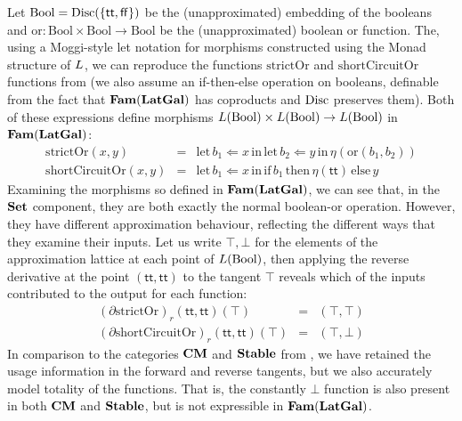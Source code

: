 \newcommand{\Bool}{\mathrm{Bool}}

Let $\Bool = \Disc(\{\mathsf{tt},\mathsf{ff}\})$ be the
(unapproximated) embedding of the booleans and
$\mathrm{or} : \Bool \times \Bool \to \Bool$ be the (unapproximated)
boolean or function. The, using a Moggi-style let notation
\cite{notions-of-computation} for morphisms constructed using the
Monad structure of $L$, we can reproduce the functions
$\mathrm{strictOr}$ and $\mathrm{shortCircuitOr}$ functions from
 (we also assume an if-then-else operation
on booleans, definable from the fact that $\mathbf{Fam}(\mathbf{LatGal})$ has
coproducts and $\mathrm{Disc}$ preserves them). Both of these expressions
define morphisms $\Lift(\Bool) \times \Lift(\Bool) \to \Lift(\Bool)$
in $\mathbf{Fam}(\mathbf{LatGal})$:
\begin{displaymath}
  \begin{array}{lcl}
    \mathrm{strictOr}(x,y)&=&\mathrm{let}\,b_1 \Leftarrow x\,\mathrm{in}\,\mathrm{let}\,b_2 \Leftarrow y\,\mathrm{in}\,\eta(\mathrm{or}(b_1,b_2)) \\
    \mathrm{shortCircuitOr}(x,y)&=&\mathrm{let}\,b_1 \Leftarrow x\,\mathrm{in}\,\mathrm{if}\,b_1\,\mathrm{then}\,\eta(\mathsf{tt})\,\mathrm{else}\,y
  \end{array}
\end{displaymath}
Examining the morphisms so defined in $\mathbf{Fam}(\mathbf{LatGal})$, we can see
that, in the $\mathbf{Set}$ component, they are both exactly the normal
boolean-or operation. However, they have different approximation
behaviour, reflecting the different ways that they examine their
inputs. Let us write $\top,\bot$ for the elements of the approximation
lattice at each point of $\Lift(\Bool)$, then applying the reverse
derivative at the point $(\mathsf{tt},\mathsf{tt})$ to the tangent
$\top$ reveals which of the inputs contributed to the output for each
function:
\begin{displaymath}
  \begin{array}{lcl}
    (\partial \mathrm{strictOr})_r(\mathsf{tt},\mathsf{tt})(\top) &=& (\top, \top)  \\
    (\partial \mathrm{shortCircuitOr})_r(\mathsf{tt},\mathsf{tt})(\top) &=& (\top, \bot)
  \end{array}
\end{displaymath}
In comparison to the categories $\mathbf{CM}$ and $\mathbf{Stable}$ from
, we have retained the usage information in
the forward and reverse tangents, but we also accurately model
totality of the functions. That is, the constantly $\bot$ function is
also present in both $\mathbf{CM}$ and $\mathbf{Stable}$, but is not expressible in
$\mathbf{Fam}(\mathbf{LatGal})$.

